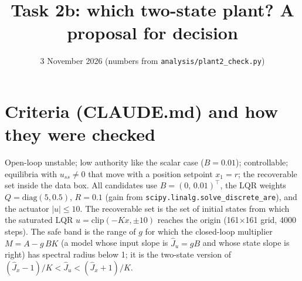\documentclass[10.5pt]{article}
\title{Task 2b: which two-state plant? A proposal for decision}
\author{}
\date{3 November 2026 (numbers from \texttt{analysis/plant2\_check.py})}
\begin{document}
\maketitle
\vspace{-1.5em}
\section*{Criteria (CLAUDE.md) and how they were checked}
Open-loop unstable; low authority like the scalar case ($B=0.01$); controllable; equilibria with $u_{ss}\ne0$ that move with a
position setpoint $x_1=r$; the recoverable set inside the data box. All candidates use $B=(0,\,0.01)^\top$, the LQR weights
$Q=\mathrm{diag}(5,0.5)$, $R=0.1$ (gain from \texttt{scipy.linalg.solve\_discrete\_are}), and the actuator $|u|\le10$.
The recoverable set is the set of initial states from which the saturated LQR $u=\mathrm{clip}(-Kx,\pm10)$ reaches the origin
(161$\times$161 grid, 4000 steps). The safe band is the range of $g$ for which the closed-loop multiplier
$M=A-g\,BK$ (a model whose input slope is $\hat J_u=gB$ and whose state slope is right) has spectral radius below 1; it is
the two-state version of $(\hat J_x-1)/K<\hat J_u<(\hat J_x+1)/K$.
\end{document}
